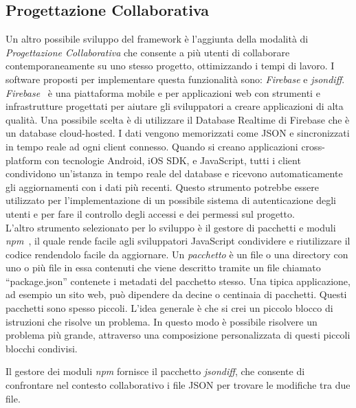 \subsection{Progettazione Collaborativa}
\label{sec:conclusions_section_2_sub_2}
Un altro possibile sviluppo del framework è l'aggiunta della modalità di \emph{Progettazione Collaborativa} che consente a più utenti
di collaborare contemporaneamente su uno stesso progetto, ottimizzando i tempi di lavoro.
I software proposti per implementare questa funzionalità sono:
\emph{Firebase} e \emph{jsondiff}.\\
\emph{Firebase}~\cite{firebase} è una piattaforma mobile e per applicazioni web con strumenti e infrastrutture progettati
per aiutare gli sviluppatori a creare applicazioni di alta qualità. Una possibile scelta è di utilizzare
il Database Realtime di Firebase che è un database cloud-hosted. I dati vengono memorizzati come JSON e
sincronizzati in tempo reale ad ogni client connesso. Quando si creano applicazioni cross-platform con
tecnologie Android, iOS SDK, e JavaScript, tutti i client condividono un'istanza in tempo reale del
database e ricevono automaticamente gli aggiornamenti con i dati più recenti.
Questo strumento potrebbe essere utilizzato per l'implementazione di un possibile sistema di autenticazione degli utenti e per
fare il controllo degli accessi e dei permessi sul progetto.\\
L'altro strumento selezionato per lo sviluppo è il gestore di pacchetti e moduli \emph{npm}~\cite{npm}, il quale rende facile agli sviluppatori
JavaScript condividere e riutilizzare il codice rendendolo facile da aggiornare.
Un \emph{pacchetto} è un file o una directory con uno o più file in essa contenuti che viene descritto tramite un file chiamato ``package.json''
contenete i metadati del pacchetto stesso. Una tipica applicazione, ad esempio un sito web, può dipendere da decine o centinaia di pacchetti.
Questi pacchetti sono spesso piccoli. L'idea generale è che si crei un piccolo blocco di istruzioni che risolve un problema.
In questo modo è possibile risolvere un problema più grande, attraverso una composizione personalizzata di questi piccoli
blocchi condivisi.
\newpage

Il gestore dei moduli \emph{npm} fornisce il pacchetto \emph{jsondiff}, che consente di confrontare nel contesto collaborativo
i file JSON per trovare le modifiche tra due file.\\

